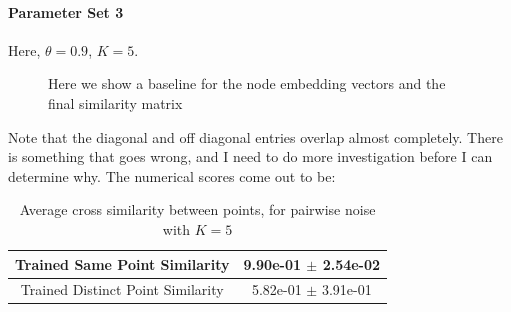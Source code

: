 \documentclass[a4paper]{article}
\begin{document}
\paragraph{Parameter Set 3}
Here, $\theta = 0.9$, $K = 5$.
\begin{figure}[H]
    \centering
    \caption{Here we show a baseline for the node embedding vectors and the final similarity matrix}
    \label{fig:pairwise5_plot}
\end{figure}
Note that the diagonal and off diagonal entries overlap almost completely.
There is something that goes wrong, and I need to do more investigation before I can determine why.
The numerical scores come out to be:
\begin{table}[H]
    \centering
    \begin{tabular}{|c|c|} \hline
        Trained Same Point Similarity      & 9.90e-01 $\pm$ 2.54e-02  \\ \hline
        Trained Distinct Point Similarity  & 5.82e-01 $\pm$ 3.91e-01  \\ \hline
    \end{tabular}
    \caption{Average cross similarity between points, for pairwise noise with $K=5$}
    \label{tab:pairwise5_table}
\end{table}
\end{document}
